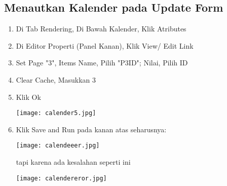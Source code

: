 \documentclass[a4paper,12pt]{report}
\begin{document}
\subsection{Menautkan Kalender pada Update Form}
\begin{enumerate}
    \item Di Tab Rendering, Di Bawah Kalender, Klik Atributes
    \item Di Editor Properti (Panel Kanan), Klik View/ Edit Link
    \item Set Page "3", Items Name, Pilih "P3ID"; Nilai, Pilih ID
    \item Clear Cache, Masukkan 3
    \item Klik Ok
      \begin{center}
    \texttt{[image: calender5.jpg]}
    \end{center}
    \item Klik Save and Run pada kanan atas
    seharusnya:
     \begin{center}
    \texttt{[image: calendeeer.jpg]}
    \end{center}
    tapi karena ada kesalahan seperti ini
      \begin{center}
    \texttt{[image: calendereror.jpg]}
    \end{center}
\end{enumerate}
\end{document}
